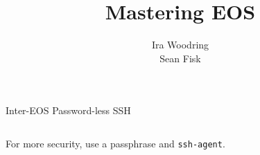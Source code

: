 \documentclass{beamer}
\title{Mastering EOS}
\author[Woodring \& Fisk]{Ira Woodring \mailtohref{woodriir@gvsu.edu} \\
  Sean Fisk \mailtohref{fiskse@mail.gvsu.edu}}
\institute[GVSU]{Grand Valley State University}
\begin{document}
\begin{frame}[fragile]{}
  \vfill
  \begin{block}{\large Inter-EOS Password-less SSH}
    \inputminted{bash}{scripts/ssh.bash}
    \bigskip
    For more security, use a passphrase and \texttt{ssh-agent}.
  \end{block}
  \vfill
\end{frame}

\end{document}
